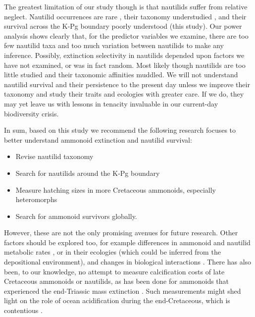 \documentclass[a4paper]{article}
\begin{document}
The greatest limitation of our study though is that nautilids suffer from relative neglect. Nautilid occurrences are rare \parencite{landmanAmmoniteExtinctionNautilid2014, stilwellRecordsNautiloideaMollusca1996}, their taxonomy understudied \parencite{lehmannOriginEvolutionaryHistory2017, wardNautilusBiologySystematics2016, wilmsenLateCampanianNautiloids2019, chiratShellMicrostructureMorphogenesis2006}, and their survival across the K-Pg boundary poorly understood (this study). Our power analysis shows clearly that, for the predictor variables we examine, there are too few nautilid taxa and too much variation between nautilids to make any inference. Possibly, extinction selectivity in nautilids depended upon factors we have not examined, or was in fact random. Most likely though nautilids are too little studied and their taxonomic affinities muddled. 
We will not understand nautilid survival and their persistence to the present day unless we improve their taxonomy and study their traits and ecologies with greater care. If we do, they may yet leave us with lessons in tenacity invaluable in our current-day biodiversity crisis.


In sum, based on this study we recommend the following research focuses to better understand ammonoid extinction and nautilid survival:
\begin{itemize}
\item Revise nautilid taxonomy
\item Search for nautilids around the K-Pg boundary
\item Measure hatching sizes in more Cretaceous ammonoids, especially heteromorphs
\item Search for ammonoid survivors globally.
\end{itemize}

However, these are not the only promising avenues for future research. Other factors should be explored too, for example differences in ammonoid and nautilid metabolic rates \parencite{tajikaAmmonoidExtinctionNautiloid2023}, or in their ecologies (which could be inferred from the depositional environment), and changes in biological interactions \parencite{garcia-gironShiftsFoodWebs2022}. 
There has also been, to our knowledge, no attempt to measure calcification costs of late Cretaceous ammonoids or nautilids, as has been done for ammonoids that experienced the end-Triassic mass extinction \parencite{weberRelativeThicknessAmmonoid2022}. Such measurements might shed light on the role of ocean acidification during the end-Cretaceous, which is contentious \parencite{yingDarknessBodySize2026, henehanRapidOceanAcidification2019}.
\end{document}
